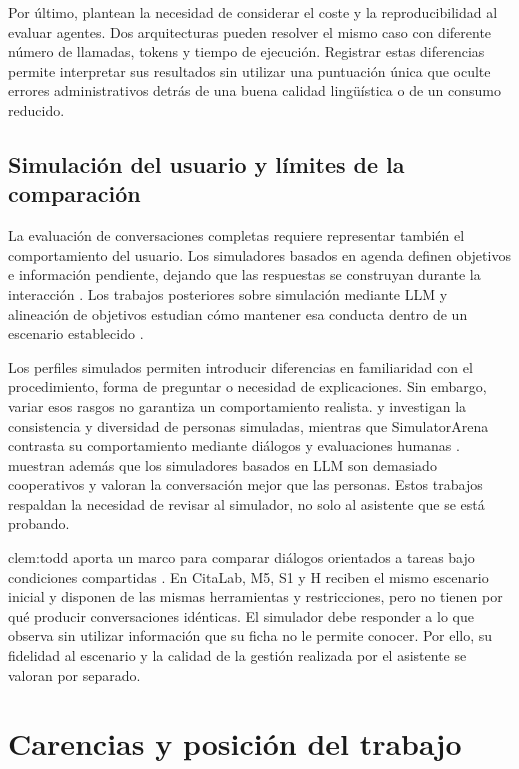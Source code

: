 Por último, \citet{kapoor2024agentsthatmatter} plantean la necesidad de considerar el coste y la reproducibilidad al evaluar agentes. Dos arquitecturas pueden resolver el mismo caso con diferente número de llamadas, tokens y tiempo de ejecución. Registrar estas diferencias permite interpretar sus resultados sin utilizar una puntuación única que oculte errores administrativos detrás de una buena calidad lingüística o de un consumo reducido.

\subsection{Simulación del usuario y límites de la comparación}

La evaluación de conversaciones completas requiere representar también el comportamiento del usuario. Los simuladores basados en agenda definen objetivos e información pendiente, dejando que las respuestas se construyan durante la interacción \citep{schatzmann2007agenda}. Los trabajos posteriores sobre simulación mediante LLM y alineación de objetivos estudian cómo mantener esa conducta dentro de un escenario establecido \citep{ni2026simulation,mehri2026goalalignment}.

Los perfiles simulados permiten introducir diferencias en familiaridad con el procedimiento, forma de preguntar o necesidad de explicaciones. Sin embargo, variar esos rasgos no garantiza un comportamiento realista. \citet{wang2025usp} y \citet{nakano2025personas} investigan la consistencia y diversidad de personas simuladas, mientras que SimulatorArena contrasta su comportamiento mediante diálogos y evaluaciones humanas \citep{dou2025simulatorarena}. \citet{zhou2026sim2real} muestran además que los simuladores basados en LLM son demasiado cooperativos y valoran la conversación mejor que las personas. Estos trabajos respaldan la necesidad de revisar al simulador, no solo al asistente que se está probando.

clem:todd aporta un marco para comparar diálogos orientados a tareas bajo condiciones compartidas \citep{kranti2025clemtodd}. En CitaLab, M5, S1 y H reciben el mismo escenario inicial y disponen de las mismas herramientas y restricciones, pero no tienen por qué producir conversaciones idénticas. El simulador debe responder a lo que observa sin utilizar información que su ficha no le permite conocer. Por ello, su fidelidad al escenario y la calidad de la gestión realizada por el asistente se valoran por separado.

\section{Carencias y posición del trabajo}

